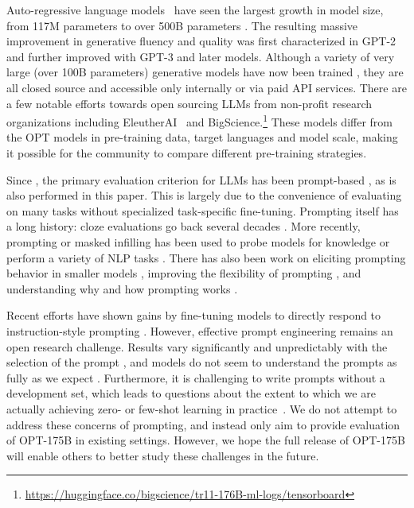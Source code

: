 Auto-regressive language models~\cite{mikolov2009neural} have seen the largest growth in model size, from 117M parameters \cite{radford2018gpt} to over 500B parameters \cite{megatron2022,palm2022}. The resulting massive improvement in generative fluency and quality was first characterized in GPT-2 \cite{radford2019language} and further improved with {GPT-3} \cite{brown2020gpt3} and later models. Although a variety of very large (over 100B parameters) generative models have now been trained \cite{J1WhitePaper,gopher2022,thoppilan2022lamda,megatron2022,palm2022}, they are all closed source and accessible only internally or via paid API services. There are a few notable efforts towards open sourcing LLMs from non-profit research organizations including EleutherAI~\cite{eleutherai2022} and BigScience.\footnote{\url{https://huggingface.co/bigscience/tr11-176B-ml-logs/tensorboard}} These models differ from the OPT models in pre-training data, target languages and model scale, making it possible for the community to compare different pre-training strategies.

Since \citet{brown2020gpt3}, the primary evaluation criterion for LLMs has been prompt-based \cite{eleutherai2022,gopher2022,palm2022}, as is also performed in this paper. This is largely due to the convenience of evaluating on many tasks without specialized task-specific fine-tuning. Prompting itself has a long history: cloze evaluations go back several decades \cite{chambers-jurafsky-2008-unsupervised,storycloze}. More recently, prompting or masked infilling has been used to probe models for knowledge \cite{petroni2019language} or perform a variety of NLP tasks \cite{radford2019language, brown2020gpt3}. There has also been work on eliciting prompting behavior in smaller models \cite{timopriming2020,gao2021,Li2021Prefix-Tuning:Generation,DBLP:journals/corr/abs-2104-08691,Scao2021HowWorth}, improving the flexibility of prompting \cite{Shin2020AutoPrompt}, and understanding why and how prompting works \cite{incontextgpt3_2021,min2022rethinking}. 

Recent efforts have shown gains by fine-tuning models to directly respond to instruction-style prompting \cite{flan2021,min2021metaicl,sanh2021multitask,ouyang2022training}. However, effective prompt engineering remains an open research challenge. Results vary significantly and unpredictably with the selection of the prompt  \cite{promptsensitivity2021}, and models do not seem to understand the prompts as fully as we expect \cite{webson2021prompt}. Furthermore, it is challenging to write prompts without a development set, which leads to questions about the extent to which we are actually achieving zero- or few-shot learning in practice~\cite{perez2021true}. We do not attempt to address these concerns of prompting, and instead only aim to provide evaluation of {OPT-175B} in existing settings. However, we hope the full release of {OPT-175B} will enable others to better study these challenges in the future. 

